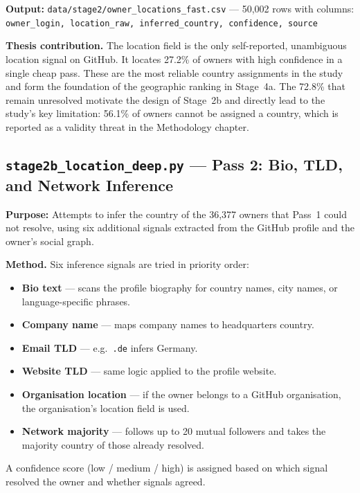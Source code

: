 \documentclass[11pt,a4paper]{article}
\begin{document}
\textbf{Output:} \texttt{data/stage2/owner\_locations\_fast.csv} ---
50,002 rows with columns: \texttt{owner\_login, location\_raw,
inferred\_country, confidence, source}

\begin{outputbox}
\textbf{Thesis contribution.}
The location field is the only self-reported, unambiguous location signal
on GitHub. It locates 27.2\% of owners with high confidence in a single
cheap pass. These are the most reliable country assignments in the study
and form the foundation of the geographic ranking in Stage~4a.
The 72.8\% that remain unresolved motivate the design of Stage~2b and
directly lead to the study's key limitation: 56.1\% of owners cannot
be assigned a country, which is reported as a validity threat in the
Methodology chapter.
\end{outputbox}

\newpage

\subsection*{\texttt{stage2b\_location\_deep.py} --- Pass 2: Bio, TLD, and Network Inference}

\begin{infobox}
\textbf{Purpose:} Attempts to infer the country of the 36,377 owners that
Pass~1 could not resolve, using six additional signals extracted from the
GitHub profile and the owner's social graph.
\end{infobox}

\textbf{Method.}
Six inference signals are tried in priority order:
\begin{itemize}
  \item \textbf{Bio text} --- scans the profile biography for country names,
        city names, or language-specific phrases.
  \item \textbf{Company name} --- maps company names to headquarters country.
  \item \textbf{Email TLD} --- e.g.\ \texttt{.de} infers Germany.
  \item \textbf{Website TLD} --- same logic applied to the profile website.
  \item \textbf{Organisation location} --- if the owner belongs to a GitHub
        organisation, the organisation's location field is used.
  \item \textbf{Network majority} --- follows up to 20 mutual followers
        and takes the majority country of those already resolved.
\end{itemize}
A confidence score (low / medium / high) is assigned based on which signal
resolved the owner and whether signals agreed.
\end{document}
